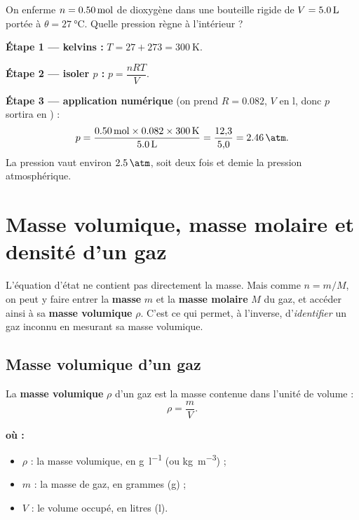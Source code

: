 \documentclass[11pt,a4paper]{article}
\newenvironment{ou}{%
  \par\smallskip\noindent\textbf{où :}\nopagebreak
  \begin{itemize}[leftmargin=1.8em,topsep=2pt,itemsep=1.5pt,parsep=0pt]}%
  {\end{itemize}}
\begin{document}
\begin{exemple}
On enferme $n=\qty{0{,}50}{\mole}$ de dioxygène  dans une bouteille rigide de
$V=\qty{5{,}0}{\litre}$ portée à $\theta=\qty{27}{\degreeCelsius}$. Quelle pression règne à
l'intérieur ?

\smallskip
\textbf{Étape 1 — kelvins :} $T=27+273=\qty{300}{\kelvin}$.

\textbf{Étape 2 — isoler $p$ :} $p=\dfrac{nRT}{V}$.

\textbf{Étape 3 — application numérique} (on prend $R=\num{0,082}$, $V$ en \si{\litre}, donc $p$ sortira
en \si{\atm}) :
\[ p=\frac{\qty{0{,}50}{\mole}\times\num{0,082}\times\qty{300}{\kelvin}}{\qty{5{,}0}{\litre}}
    =\frac{12{,}3}{5{,}0}=\qty{2{,}46}{\atm}. \]
La pression vaut environ $\qty{2{,}5}{\atm}$, soit deux fois et demie la pression atmosphérique.
\end{exemple}

\section{Masse volumique, masse molaire et densité d'un gaz}
L'équation d'état ne contient pas directement la masse. Mais comme $n=m/M$, on peut y faire entrer la
\textbf{masse} $m$ et la \textbf{masse molaire} $M$ du gaz, et accéder ainsi à sa \textbf{masse
volumique} $\rho$. C'est ce qui permet, à l'inverse, d'\emph{identifier} un gaz inconnu en mesurant sa
masse volumique.

\subsection{Masse volumique d'un gaz}

\begin{definition}
La \textbf{masse volumique} $\rho$ d'un gaz est la masse contenue dans l'unité de volume :
\[ \rho=\frac{m}{V}. \]
\end{definition}

\begin{ou}
  \item $\rho$ : la masse volumique, en \si{\gram\per\litre} (ou \si{\kilo\gram\per\meter\cubed}) ;
  \item $m$ : la masse de gaz, en grammes (\si{\gram}) ;
  \item $V$ : le volume occupé, en litres (\si{\litre}).
\end{ou}
\end{document}
